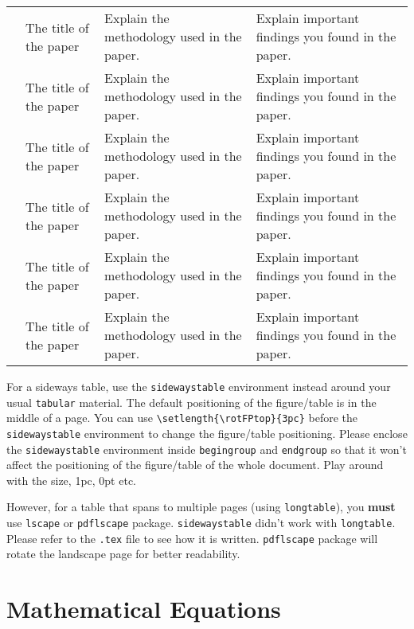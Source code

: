 \begin{landscape}
\begin{longtable}{m{} m{} m{} m{}}
		\citet{othman2019effect}  & The title of the paper & Explain the methodology used in the paper. & Explain important findings you found in the paper. \\
		\citet{wanna2018fracture} & The title of the paper & Explain the methodology used in the paper. & Explain important findings you found in the paper. \\
		\citet{matsom:template}  & The title of the paper & Explain the methodology used in the paper. & Explain important findings you found in the paper. \\
		\citet{othman2019effect} & The title of the paper & Explain the methodology used in the paper. & Explain important findings you found in the paper. \\
		\citet{othman2019effect}  & The title of the paper & Explain the methodology used in the paper. & Explain important findings you found in the paper. \\
		\citet{wanna2018fracture} & The title of the paper & Explain the methodology used in the paper. & Explain important findings you found in the paper. \\
	\end{longtable}
\end{landscape}

For a sideways table, use the \verb|sidewaystable| environment instead around your usual \verb|tabular| material. The default positioning of the figure/table is in the middle of a page. You can use \verb|\setlength{\rotFPtop}{3pc}| before the \verb|sidewaystable| environment to change the figure/table positioning. Please enclose the \verb|sidewaystable| environment inside \verb|begingroup| and \verb|endgroup| so that it won't affect the positioning of the figure/table of the whole document. Play around with the size, 1pc, 0pt etc. 

However, for a table that spans to multiple pages (using \verb|longtable|), you \textbf{must} use \verb|lscape| or \verb|pdflscape| package. \verb|sidewaystable| didn't work with \verb|longtable|. Please refer to the \verb|.tex| file to see how it is written. \verb|pdflscape| package will rotate the landscape page for better readability. 

\section{Mathematical Equations}


